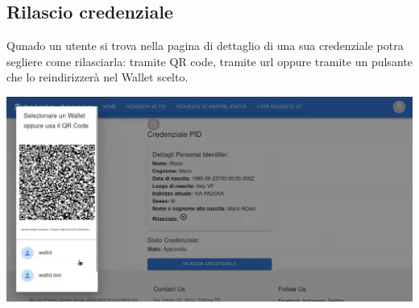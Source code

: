 \subsection{Rilascio credenziale}
Qunado un utente si trova nella pagina di dettaglio di una sua credenziale potra segliere come rilasciarla: tramite QR code, tramite url oppure tramite un 
pulsante che lo reindirizzerà nel Wallet scelto.
\begin{center}
\includegraphics[scale = 0.2]{./res/img/issuer/rilascio/rilascio1.png}    
\end{center}

